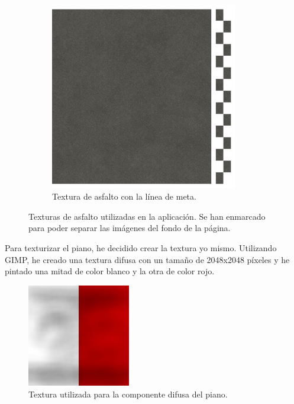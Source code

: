 \begin{figure}[H]
\begin{subfigure}[t]{0.48\textwidth}
	    \centering
	    \includegraphics[width=0.9\textwidth,cframe=black 1pt 0pt]{imagenes/converted/pista/Asphalt024A_2K_Color_FinishLineFinal.jpg}
        \caption{Textura de asfalto con la línea de meta.}
    \end{subfigure}    
    \caption{Texturas de asfalto utilizadas en la aplicación. Se han enmarcado para poder separar las imágenes del fondo de la página.}
    \label{fig:asfaltoTextura}
\end{figure}

Para texturizar el piano, he decidido crear la textura yo mismo. Utilizando GIMP, he creado una textura difusa con un tamaño de 2048x2048 píxeles y he pintado una mitad de color blanco y la otra de color rojo. 


\begin{figure}[H]
    \centering
    \includegraphics[width=0.4\textwidth]{imagenes/converted/pista/kerb-dirty2.jpg}
    \caption{Textura utilizada para la componente difusa del piano.}
    \label{fig:pianodiff}
\end{figure}

